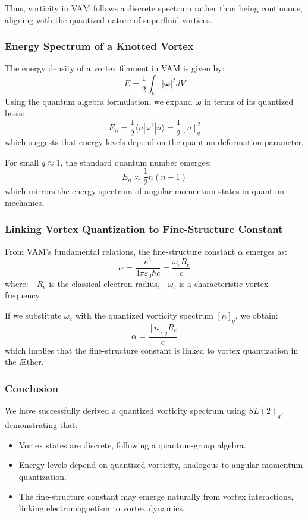 \documentclass[a4paper,10pt]{article}
\begin{document}
Thus, vorticity in VAM follows a discrete spectrum rather than being continuous, aligning with the quantized nature of superfluid vortices.

\subsubsection*{Energy Spectrum of a Knotted Vortex}
The energy density of a vortex filament in VAM is given by:
\begin{equation*}
    E = \frac{1}{2} \int_V |\boldsymbol{\omega}|^2 dV
\end{equation*}
Using the quantum algebra formulation, we expand $\boldsymbol{\omega}$ in terms of its quantized basis:
\begin{equation*}
    E_n = \frac{1}{2} \langle n | \omega^2 | n \rangle = \frac{1}{2} [n]_q^2
\end{equation*}
which suggests that energy levels depend on the quantum deformation parameter.

For small $q \approx 1$, the standard quantum number emerges:
\begin{equation*}
    E_n \approx \frac{1}{2} n(n+1)
\end{equation*}
which mirrors the energy spectrum of angular momentum states in quantum mechanics.

\subsubsection*{Linking Vortex Quantization to Fine-Structure Constant}
From VAM's fundamental relations, the fine-structure constant $\alpha$ emerges as:
\begin{equation*}
    \alpha = \frac{e^2}{4\pi \varepsilon_0 \hbar c} = \frac{\omega_c R_e}{c}
\end{equation*}
where:
- $R_e$ is the classical electron radius,
- $\omega_c$ is a characteristic vortex frequency.

If we substitute $\omega_c$ with the quantized vorticity spectrum $[n]_q$, we obtain:
\begin{equation*}
    \alpha = \frac{[n]_q R_e}{c}
\end{equation*}
which implies that the fine-structure constant is linked to vortex quantization in the Æther.

\subsubsection*{Conclusion}
We have successfully derived a quantized vorticity spectrum using $SL(2)_q$, demonstrating that:
\begin{itemize}
    \item Vortex states are discrete, following a quantum-group algebra.
    \item Energy levels depend on quantized vorticity, analogous to angular momentum quantization.
    \item The fine-structure constant may emerge naturally from vortex interactions, linking electromagnetism to vortex dynamics.
\end{itemize}
\end{document}
